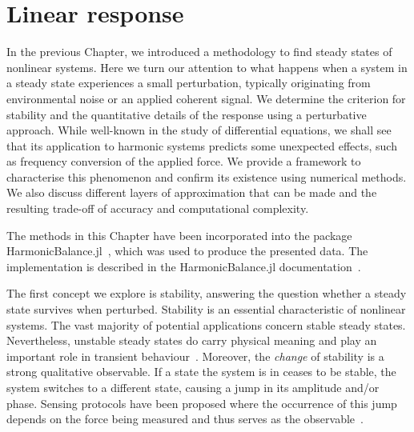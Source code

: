 
\newcommand{\bbar}[1]{\bar{\boldsymbol{#1}}}
\newcommand{\bdel}[1]{\boldsymbol{\delta} \vb{#1}}

\chapter{Linear response} \label{ch:linresp}

\begin{chapterabstract}
	In the previous Chapter, we introduced a methodology to find steady states of nonlinear systems. Here we turn our attention to what happens when a system in a steady state experiences a small perturbation, typically originating from environmental noise or an applied coherent signal. We determine the criterion for stability and the quantitative details of the response using a perturbative approach. While well-known in the study of differential equations, we shall see that its application to harmonic systems predicts some unexpected effects, such as frequency conversion of the applied force. We provide a framework to characterise this phenomenon and confirm its existence using numerical methods. We also discuss different layers of approximation that can be made and the resulting trade-off of accuracy and computational complexity. 
	
%
\tcblower
%
The methods in this Chapter have been incorporated into the package HarmonicBalance.jl~\cite{Kosata_2022a}, which was used to produce the presented data. The implementation is described in the HarmonicBalance.jl documentation~\cite{harmonic_balance_docs}. 
\end{chapterabstract}

The first concept we explore is stability, answering the question whether a steady state survives when perturbed. Stability is an essential characteristic of nonlinear systems. The vast majority of potential applications concern stable steady states. Nevertheless, unstable steady states do carry physical meaning and play an important role in transient behaviour~\cite{Heugel_2022}. Moreover, the \textit{change} of stability is a strong qualitative observable. If a state the system is in ceases to be stable, the system switches to a different state, causing a jump in its amplitude and/or phase. Sensing protocols have been proposed where the occurrence of this jump depends on the force being measured and thus serves as the observable~\cite{Papariello_2016, Leuch_2016}.  

